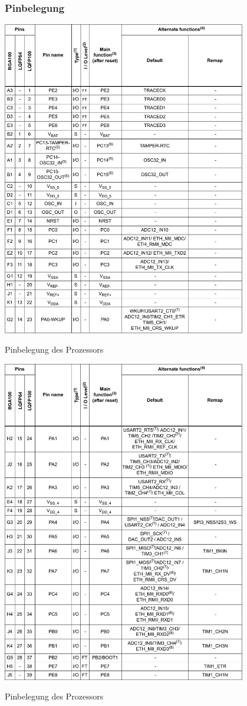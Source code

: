\subsubsection{Pinbelegung}
\begin{table}[htb]
    \centering
    \includegraphics[width=0.8\textwidth]{Schuh/Pictures/Pinbelegung1}
    \caption[Pinbelegung des Prozessors]{Pinbelegung des Prozessors \cite{stm:stm32f107rc}}
    \label{tab:coremodul-cpupins}
\end{table}
\begin{table}[htb]\ContinuedFloat
    \centering
    \includegraphics[width=0.8\textwidth]{Schuh/Pictures/Pinbelegung2}
    \caption[Pinbelegung des Prozessors]{Pinbelegung des Prozessors \cite{stm:stm32f107rc}}
\end{table}
